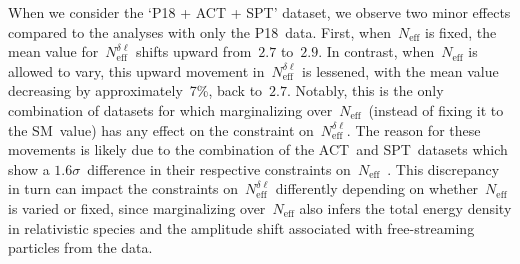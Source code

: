 \documentclass[11pt]{article}
\numberwithin{equation}{section}
\newcommand{\Neff}{N_\mathrm{eff}}
\newcommand{\Nmultipole}{N_\mathrm{eff}^{\delta\ell}}
\begin{document}
When we consider the `P18 + ACT + SPT' dataset, we observe two minor effects compared to the analyses with only the P18~data. First, when~$\Neff$ is fixed, the mean value for~$\Nmultipole$ shifts upward from~$2.7$ to~$2.9$. In contrast, when~$\Neff$ is allowed to vary, this upward movement in~$\Nmultipole$ is lessened, with the mean value decreasing by approximately~7\%, back to~$2.7$. Notably, this is the only combination of datasets for which marginalizing over~$\Neff$~(instead of fixing it to the SM~value) has any effect on the constraint on~$\Nmultipole$. The reason for these movements is likely due to the combination of the ACT~and SPT~datasets which show a $1.6\sigma$~difference in their respective constraints on~$\Neff$~\cite{ACT:2020gnv, SPT-3G:2022hvq}. This discrepancy in turn can impact the constraints on~$\Nmultipole$ differently depending on whether~$\Neff$ is varied or fixed, since marginalizing over~$\Neff$ also infers the total energy density in relativistic species and the amplitude shift associated with free-streaming particles from the data.
\end{document}
